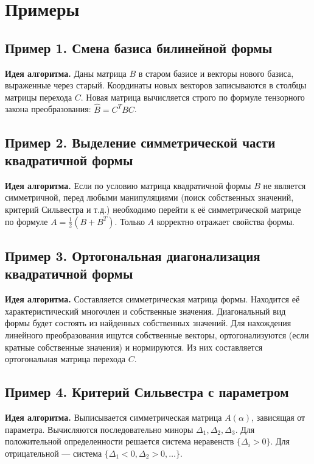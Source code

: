 \section*{Примеры}

\subsection*{Пример 1. Смена базиса билинейной формы}
\textbf{Идея алгоритма.} Даны матрица $B$ в старом базисе и векторы нового базиса, выраженные через старый. Координаты новых векторов записываются в столбцы матрицы перехода $C$. Новая матрица вычисляется строго по формуле тензорного закона преобразования: $\hat{B} = C^T B C$.

\subsection*{Пример 2. Выделение симметрической части квадратичной формы}
\textbf{Идея алгоритма.} Если по условию матрица квадратичной формы $B$ не является симметричной, перед любыми манипуляциями (поиск собственных значений, критерий Сильвестра и т.д.) необходимо перейти к её симметрической матрице по формуле $A = \frac{1}{2}(B + B^T)$. Только $A$ корректно отражает свойства формы.

\subsection*{Пример 3. Ортогональная диагонализация квадратичной формы}
\textbf{Идея алгоритма.} Составляется симметрическая матрица формы. Находится её характеристический многочлен и собственные значения. Диагональный вид формы будет состоять из найденных собственных значений. Для нахождения линейного преобразования ищутся собственные векторы, ортогонализуются (если кратные собственные значения) и нормируются. Из них составляется ортогональная матрица перехода $C$.

\subsection*{Пример 4. Критерий Сильвестра с параметром}
\textbf{Идея алгоритма.} Выписывается симметрическая матрица $A(\alpha)$, зависящая от параметра. Вычисляются последовательно миноры $\Delta_1, \Delta_2, \Delta_3$. Для положительной определенности решается система неравенств $\{\Delta_i > 0\}$. Для отрицательной — система $\{\Delta_1 < 0, \Delta_2 > 0, \dots\}$.
